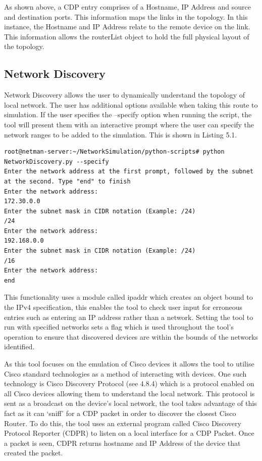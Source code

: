 \documentclass[11pt]{report}
\begin{document}
As shown above, a CDP entry comprises of a Hostname, IP Address and source and destination ports. This information maps the links in the topology. In this instance, the Hostname and IP Address relate to the remote device on the link. This information allows the routerList object to hold the full physical layout of the topology.

\subsection{Network Discovery}

Network Discovery allows the user to dynamically understand the topology of local network. The user has additional options available when taking this route to simulation. If the user specifies the --specify option when running the script, the tool will present them with an interactive prompt where the user can specify the network ranges to be added to the simulation. This is shown in Listing 5.1.

\begin{lstlisting}[caption=Example of specifyinh network ranges]
root@netman-server:~/NetworkSimulation/python-scripts# python NetworkDiscovery.py --specify
Enter the network address at the first prompt, followed by the subnet at the second. Type "end" to finish
Enter the network address:
172.30.0.0
Enter the subnet mask in CIDR notation (Example: /24)
/24
Enter the network address:
192.168.0.0 
Enter the subnet mask in CIDR notation (Example: /24)
/16
Enter the network address:
end
\end{lstlisting}

This functionality uses a module called ipaddr \citep{ipaddr} which creates an object bound to the IPv4 specification, this enables the tool to check user input for erroneous entries such as entering an IP address rather than a network. Setting the tool to run with specified networks sets a flag which is used throughout the tool's operation to ensure that discovered devices are within the bounds of the networks identified.

As this tool focuses on the emulation of Cisco devices it allows the tool to utilise Cisco standard technologies as a method of interacting with devices. One such technology is Cisco Discovery Protocol (see 4.8.4) which is a protocol enabled on all Cisco devices allowing them to understand the local network. This protocol is sent as a broadcast on the device's local network, the tool takes advantage of this fact as it can `sniff' for a CDP packet in order to discover the closest Cisco Router. To do this, the tool uses an external program called Cisco Discovery Protocol Reporter (CDPR)  \citep{CDPR} to listen on a local interface for a CDP Packet. Once a packet is seen, CDPR returns hostname and IP Address of the device that created the packet.
\end{document}
